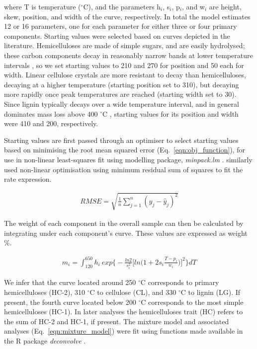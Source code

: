 \documentclass{article}
\begin{document}
where T is temperature ($^\circ$C), and the parameters h$_i$, s$_i$, p$_i$, and w$_i$ are height, skew, position, and width of the curve, respectively. In total the model estimates 12 or 16 parameters, one for each parameter for either three or four primary components. Starting values were selected based on curves depicted in the literature. Hemicelluloses are made of simple sugars, and are easily hydrolysed; these carbon components decay in reasonably narrow bands at lower temperature intervals \citep{barneto2009,muller-hagedorn2007}, so we set starting values to 210 and 270 for position and 50 each for width. Linear cellulose crystals are more resistant to decay than hemicelluloses, decaying at a higher temperature (starting position set to 310), but decaying more rapidly once peak temperatures are reached (starting width set to 30). Since lignin typically decays over a wide temperature interval, and in general dominates mass loss above 400 $^{\circ}$C \citep{chen2015,cai2013,cai2014,varhegyi2011}, starting values for its position and width were 410 and 200, respectively. 

Starting values are first passed through an optimiser to select starting values based on minimising the root mean squared error (Eq.~\ref{eqn:obj_function}), for use in non-linear least-squares fit using modelling package, \textit{minpack.lm} \citep{minpack.lm}. \citet{cheng2015} similarly used non-linear optimisation using minimum residual sum of squares to fit the rate expression. 

\begin{gather}\label{eqn:obj_function}
	RMSE = \sqrt{\frac{1}{n} \sum_{j=1}^{n} (y_j - \hat{y}_j)^2}
\end{gather}

The weight of each component in the overall sample can then be calculated by integrating under each component's curve. These values are expressed as weight \%. 

\begin{gather}\label{eqn:integration}
	m_i = \int_{120}^{650} h_i\ exp\bigg\{-\frac{ln2}{s_i^2}\Big[ln\Big(1 + 2s_i \frac{T - p_i}{w_i}\Big)\Big]^2\bigg\} dT
\end{gather}

We infer that the curve located around 250 $^\circ$C corresponds to primary hemicelluloses (HC-2), 310 $^\circ$C to cellulose (CL), and 330 $^\circ$C to lignin (LG). If present, the fourth curve located below 200 $^\circ$C corresponds to the most simple hemicelluloses (HC-1). In later analyses the hemicelluloses trait (HC) refers to the sum of HC-2 and HC-1, if present. The mixture model and associated analyses (Eq.~\ref{eqn:mixture_model}) were fit using functions made available in the R package \textit{deconvolve} \citep{deconvolve}. 
\end{document}
